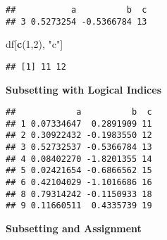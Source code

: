 \documentclass[11pt,]{article}
\newenvironment{Shaded}{\begin{snugshade}}{\end{snugshade}}
\newcommand{\KeywordTok}[1]{\textcolor[rgb]{0.13,0.29,0.53}{\textbf{#1}}}
\newcommand{\DecValTok}[1]{\textcolor[rgb]{0.00,0.00,0.81}{#1}}
\newcommand{\FloatTok}[1]{\textcolor[rgb]{0.00,0.00,0.81}{#1}}
\newcommand{\StringTok}[1]{\textcolor[rgb]{0.31,0.60,0.02}{#1}}
\newcommand{\CommentTok}[1]{\textcolor[rgb]{0.56,0.35,0.01}{\textit{#1}}}
\newcommand{\OtherTok}[1]{\textcolor[rgb]{0.56,0.35,0.01}{#1}}
\newcommand{\OperatorTok}[1]{\textcolor[rgb]{0.81,0.36,0.00}{\textbf{#1}}}
\newcommand{\NormalTok}[1]{#1}
\begin{document}
\begin{Shaded}
\end{Shaded}

\begin{verbatim}
##           a          b  c
## 3 0.5273254 -0.5366784 13
\end{verbatim}

\begin{Shaded}
\begin{Highlighting}[]
\NormalTok{df[}\KeywordTok{c}\NormalTok{(}\DecValTok{1}\NormalTok{,}\DecValTok{2}\NormalTok{), }\StringTok{"c"}\NormalTok{]}
\end{Highlighting}
\end{Shaded}

\begin{verbatim}
## [1] 11 12
\end{verbatim}

\textbf{Subsetting with Logical Indices}

\begin{Shaded}
\end{Shaded}

\begin{verbatim}
##            a          b  c
## 1 0.07334647  0.2891909 11
## 2 0.30922432 -0.1983550 12
## 3 0.52732537 -0.5366784 13
## 4 0.08402270 -1.8201355 14
## 5 0.02421654 -0.6866562 15
## 6 0.42104029 -1.1016686 16
## 8 0.79314242 -0.1150933 18
## 9 0.11660511  0.4335739 19
\end{verbatim}

\textbf{Subsetting and Assignment}

\begin{Shaded}
\end{Shaded}
\end{document}
